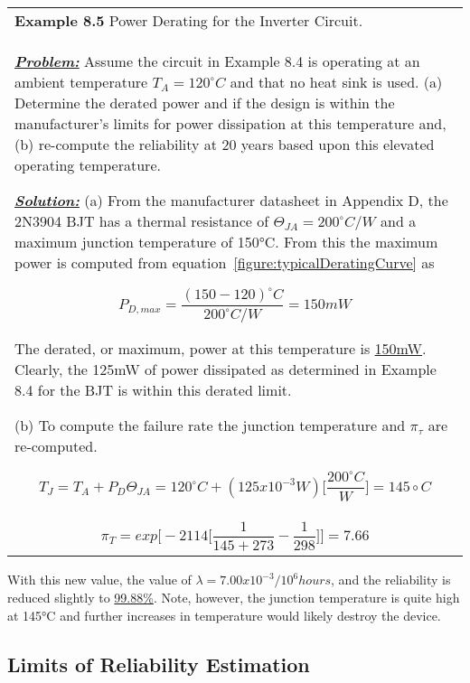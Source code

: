 \begin{table}
\begin{tabular}{m{15cm}|}
\textbf{Example 8.5} 
Power Derating for the Inverter Circuit.\\

\emph{\textbf{\ul{Problem:}}} Assume the circuit in Example 8.4 is
operating at an ambient temperature $T_A = 120^\circ C$ and 
that no heat sink is used.
(a) Determine the derated power and if the design is within the
manufacturer's limits for power dissipation at this temperature and, (b)
re-compute the reliability at 20 years based upon this elevated
operating temperature.

\emph{\textbf{\ul{Solution:}}}
(a) From the manufacturer datasheet in Appendix D, the 2N3904 BJT has a
thermal resistance of $\Theta_{JA} = 200^\circ C/W$ and a
maximum junction temperature of 150°C. From this the maximum power is
computed from equation~\ref{figure:typicalDeratingCurve} as

$$P_{D,max} = \frac{(150 - 120)^\circ C}{200^\circ C/W} = 150mW$$

The derated, or maximum, power at this temperature is \ul{150mW}.
Clearly, the 125mW of power dissipated as determined in Example 8.4 for
the BJT is within this derated limit.

(b) To compute the failure rate the junction temperature and
$\pi_\tau$ are re-computed.

$$T_J = T_A + P_D\Theta_{JA} = 120^\circ C + (125x10^{-3} W) \big[ \frac{200^\circ C}{W} \big]= 145\circ C $$\\
$$\pi_T = exp\big[ -2114 \big[ \frac{1}{145+273} - \frac{1}{298} \big] \big] = 7.66$$
\end{tabular}
\end{table}

With this new value, the value of $\lambda=7.00x10^{-3}/10^6 hours$, and 
the reliability is reduced slightly to \ul{99.88\%}. Note, however, the junction 
temperature is
quite high at 145°C and further increases in temperature would likely
destroy the device.

\subsection{Limits of Reliability Estimation}
\label{subsection:limits-of-reliability-estimation}

